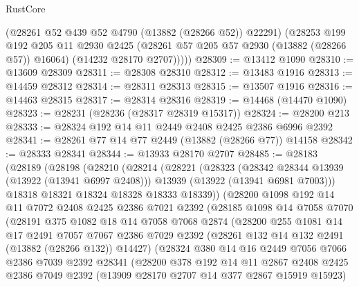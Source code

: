 \begin{lexlean}{RustCore}
\begin{coremodule}
          (@28261 @52 @439 @52 @4790 (@13882 (@28266 @52)) @22291)
          (@28253
            @199
            @192
            @205
            @11
            @2930
            @2425
            (@28261 @57 @205 @57 @2930 (@13882 (@28266 @57)) @16064)
            (@14232 @28170 @2707)))))
@28309 := @13412 @1090
@28310 := @13609 @28309
@28311 := @28308 @28310
@28312 := @13483 @1916
@28313 := @14459 @28312
@28314 := @28311 @28313
@28315 := @13507 @1916
@28316 := @14463 @28315
@28317 := @28314 @28316
@28319 := @14468 (@14470 @1090)
@28323 := @28231 (@28236 (@28317 @28319 @15317))
@28324 := @28200 @213
@28333 := @28324 @192 @14 @11 @2449 @2408 @2425 @2386 @6996 @2392
@28341 := @28261 @77 @14 @77 @2449 (@13882 (@28266 @77)) @14158
@28342 := @28333 @28341
@28344 := @13933 @28170 @2707
@28485 := @28183
    (@28189
      (@28198
        (@28210
          (@28214
            (@28221
              (@28323
                (@28342 @28344 @13939 (@13922 (@13941 @6997 @2408)))
                @13939
                (@13922 (@13941 @6981 @7003)))
              @18318
              @18321
              @18324
              @18328
              @18333
              @18339))
          (@28200
            @1098
            @192
            @14
            @11
            @7072
            @2408
            @2425
            @2386
            @7021
            @2392
            (@28185
              @1098
              @14
              @7058
              @7070
              (@28191
                @375
                @1082
                @18
                @14
                @7058
                @7068
                @2874
                (@28200
                  @255
                  @1081
                  @14
                  @17
                  @2491
                  @7057
                  @7067
                  @2386
                  @7029
                  @2392
                  (@28261 @132 @14 @132 @2491 (@13882 (@28266 @132)) @14427)
                  (@28324
                    @380
                    @14
                    @16
                    @2449
                    @7056
                    @7066
                    @2386
                    @7039
                    @2392
                    @28341
                    (@28200
                      @378
                      @192
                      @14
                      @11
                      @2867
                      @2408
                      @2425
                      @2386
                      @7049
                      @2392
                      (@13909 @28170 @2707 @14 @377 @2867 @15919 @15923)

\end{coremodule}
\end{lexlean}
